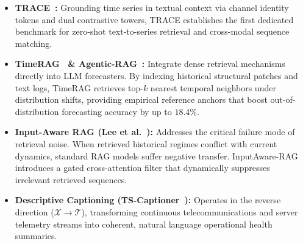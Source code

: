 \begin{itemize}
    \item \textbf{TRACE~\cite{Chen2025TRACE}:} Grounding time series in textual context via channel identity tokens and dual contrastive towers, TRACE establishes the first dedicated benchmark for zero-shot text-to-series retrieval and cross-modal sequence matching.
    \item \textbf{TimeRAG~\cite{Yang2024TimeRAG} \& Agentic-RAG~\cite{Ravuru2024AgenticRAG}:} Integrate dense retrieval mechanisms directly into LLM forecasters. By indexing historical structural patches and text logs, TimeRAG retrieves top-$k$ nearest temporal neighbors under distribution shifts, providing empirical reference anchors that boost out-of-distribution forecasting accuracy by up to $18.4\%$.
    \item \textbf{Input-Aware RAG (Lee et al.~\cite{Lee2026RAG}):} Addresses the critical failure mode of retrieval noise. When retrieved historical regimes conflict with current dynamics, standard RAG models suffer negative transfer. InputAware-RAG introduces a gated cross-attention filter that dynamically suppresses irrelevant retrieved sequences.
    \item \textbf{Descriptive Captioning (TS-Captioner~\cite{Trabelsi2025Caption}):} Operates in the reverse direction ($\mathcal{X} \to \mathcal{T}$), transforming continuous telecommunications and server telemetry streams into coherent, natural language operational health summaries.
\end{itemize}

